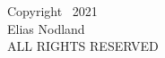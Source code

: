 \begin{center}
\null\vfill
\noindent
Copyright \textcopyright\ 2021 \\
Elias Nodland \\
ALL RIGHTS RESERVED \\
\vspace{2in}
\end{center}
\cleardoublepage
